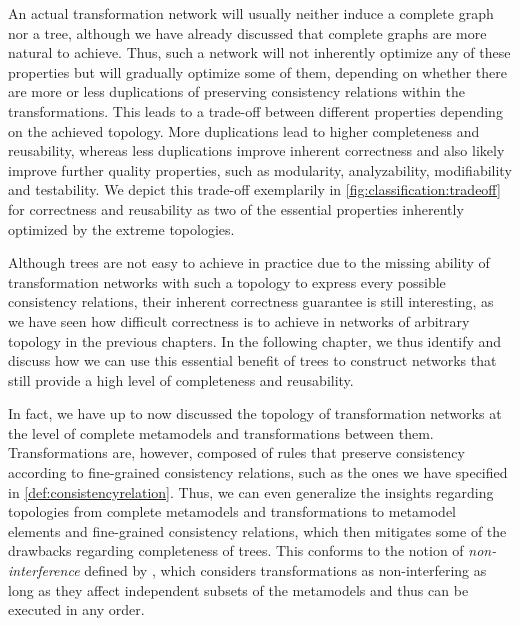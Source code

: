 An actual transformation network will usually neither induce a complete graph nor a tree, although we have already discussed that complete graphs are more natural to achieve.
Thus, such a network will not inherently optimize any of these properties but will gradually optimize some of them, depending on whether there are more or less duplications of preserving consistency relations within the transformations.
This leads to a trade-off between different properties depending on the achieved topology.
More duplications lead to higher completeness and reusability, whereas less duplications improve inherent correctness and also likely improve further quality properties, such as modularity, analyzability, modifiability and testability.
We depict this trade-off exemplarily in \autoref{fig:classification:tradeoff} for correctness and reusability as two of the essential properties inherently optimized by the extreme topologies.

Although trees are not easy to achieve in practice due to the missing ability of transformation networks with such a topology to express every possible consistency relations, their inherent correctness guarantee is still interesting, as we have seen how difficult correctness is to achieve in networks of arbitrary topology in the previous chapters.
In the following chapter, we thus identify and discuss how we can use this essential benefit of trees to construct networks that still provide a high level of completeness and reusability.

In fact, we have up to now discussed the topology of transformation networks at the level of complete metamodels and transformations between them.
Transformations are, however, composed of rules that preserve consistency according to fine-grained consistency relations, such as the ones we have specified in \autoref{def:consistencyrelation}.
Thus, we can even generalize the insights regarding topologies from complete metamodels and transformations to metamodel elements and fine-grained consistency relations, which then mitigates some of the drawbacks regarding completeness of trees.
This conforms to the notion of \emph{non-interference} defined by \textcite{stevens2020BidirectionalTransformationLarge-SoSym}, which considers transformations as non-interfering as long as they affect independent subsets of the metamodels and thus can be executed in any order.



